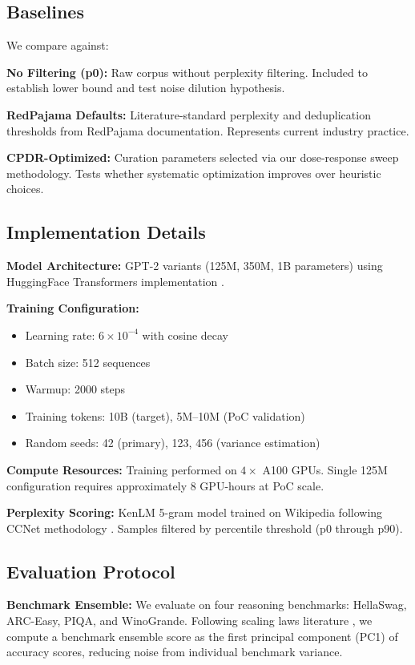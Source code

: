 \subsection{Baselines}

We compare against:

\textbf{No Filtering (p0):} Raw corpus without perplexity filtering. Included to establish lower bound and test noise dilution hypothesis.

\textbf{RedPajama Defaults:} Literature-standard perplexity and deduplication thresholds from RedPajama documentation. Represents current industry practice.

\textbf{CPDR-Optimized:} Curation parameters selected via our dose-response sweep methodology. Tests whether systematic optimization improves over heuristic choices.

\subsection{Implementation Details}

\textbf{Model Architecture:} GPT-2 variants (125M, 350M, 1B parameters) using HuggingFace Transformers implementation \citep{radford2019gpt2}.

\textbf{Training Configuration:}
\begin{itemize}
    \item Learning rate: $6 \times 10^{-4}$ with cosine decay
    \item Batch size: 512 sequences
    \item Warmup: 2000 steps
    \item Training tokens: 10B (target), 5M--10M (PoC validation)
    \item Random seeds: 42 (primary), 123, 456 (variance estimation)
\end{itemize}

\textbf{Compute Resources:} Training performed on $4 \times$ A100 GPUs. Single 125M configuration requires approximately 8 GPU-hours at PoC scale.

\textbf{Perplexity Scoring:} KenLM 5-gram model trained on Wikipedia following CCNet methodology \citep{wenzek2020ccnet}. Samples filtered by percentile threshold (p0 through p90).

\subsection{Evaluation Protocol}

\textbf{Benchmark Ensemble:} We evaluate on four reasoning benchmarks: HellaSwag, ARC-Easy, PIQA, and WinoGrande. Following scaling laws literature \citep{hoffmann2022chinchilla}, we compute a benchmark ensemble score as the first principal component (PC1) of accuracy scores, reducing noise from individual benchmark variance.

